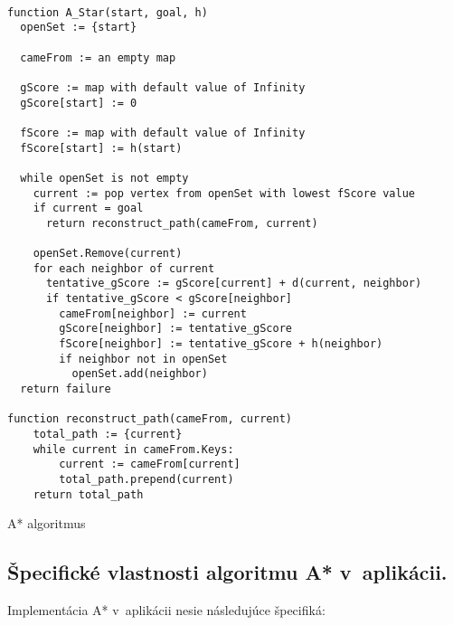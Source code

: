 \begin{listing}
\begin{lstlisting}

function A_Star(start, goal, h)
  openSet := {start}

  cameFrom := an empty map

  gScore := map with default value of Infinity
  gScore[start] := 0

  fScore := map with default value of Infinity
  fScore[start] := h(start)

  while openSet is not empty
    current := pop vertex from openSet with lowest fScore value
    if current = goal
      return reconstruct_path(cameFrom, current)

    openSet.Remove(current)
    for each neighbor of current
      tentative_gScore := gScore[current] + d(current, neighbor)
      if tentative_gScore < gScore[neighbor]
        cameFrom[neighbor] := current
        gScore[neighbor] := tentative_gScore
        fScore[neighbor] := tentative_gScore + h(neighbor)
        if neighbor not in openSet
          openSet.add(neighbor)
  return failure

function reconstruct_path(cameFrom, current)
    total_path := {current}
    while current in cameFrom.Keys:
        current := cameFrom[current]
        total_path.prepend(current)
    return total_path

\end{lstlisting}
\caption{A* algoritmus}
\label{AStar}
\end{listing}

\pagebreak

\subsection{Špecifické vlastnosti algoritmu A* v~aplikácii.}

Implementácia A* v~aplikácii nesie následujúce špecifiká:

